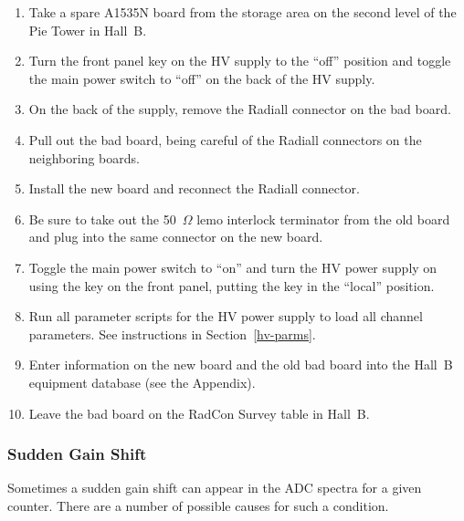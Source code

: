\documentclass[12pt]{article}
\begin{document}
\begin{enumerate}
\item Take a spare A1535N board from the storage area on the second level of the Pie Tower in Hall~B.
\item Turn the front panel key on the HV supply to the ``off'' position and toggle the main power 
switch to ``off'' on the back of the HV supply.
\item On the back of the supply, remove the Radiall connector on the bad board.
\item Pull out the bad board, being careful of the Radiall connectors on the neighboring boards.
\item Install the new board and reconnect the Radiall connector.
\item Be sure to take out the 50~$\Omega$ lemo interlock terminator from the old board and plug into
the same connector on the new board.
\item Toggle the main power switch to ``on'' and turn the HV power supply on using the key on the front 
panel, putting the key in the ``local'' position.
\item Run all parameter scripts for the HV power supply to load all channel parameters. See instructions
in Section~\ref{hv-parms}.
\item Enter information on the new board and the old bad board into the Hall~B equipment database (see
the Appendix).
\item Leave the bad board on the RadCon Survey table in Hall~B.
\end{enumerate}

\subsubsection{Sudden Gain Shift}
\label{gain-shift}

Sometimes a sudden gain shift can appear in the ADC spectra for a given counter. There are a number of
possible causes for such a condition.
\end{document}
